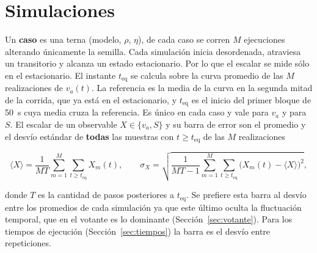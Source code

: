 \documentclass[10pt,a4paper]{article}
\newcommand{\va}{\ensuremath{v_a}}
\newcommand{\teq}{\ensuremath{t_{\mathrm{eq}}}}
\begin{document}
\section{Simulaciones}

Un \textbf{caso} es una terna (modelo, $\rho$, $\eta$), de cada caso se corren $M$ ejecuciones alterando únicamente la semilla.
Cada simulación inicia desordenada, atraviesa un transitorio y alcanza un estado estacionario. Por lo que el escalar se mide sólo en el estacionario. El instante \teq{} se calcula sobre la curva promedio de las $M$ realizaciones de $\va(t)$.
La referencia es la media de la curva en la segunda mitad de la corrida, que ya está en el estacionario, y \teq{} es el inicio del primer bloque de \SI{50}{s} cuya media cruza la referencia. Es único en cada caso y vale para \va{} y para $S$. El escalar de un observable $X \in \{\va, S\}$ y su barra de error son el promedio y el desvío estándar de \textbf{todas} las muestras con $t \ge \teq$ de las $M$ realizaciones

\begin{equation}
    \langle X \rangle = \frac{1}{M T} \sum_{m=1}^{M} \sum_{t \ge \teq} X_m(t),
    \qquad
    \sigma_X = \sqrt{\frac{1}{M T - 1} \sum_{m=1}^{M} \sum_{t \ge \teq}
               \big(X_m(t) - \langle X \rangle\big)^2},
    \label{eq:promedio}
\end{equation}

donde $T$ es la cantidad de pasos posteriores a \teq. Se prefiere esta barra al desvío entre los promedios de cada simulación ya que este último oculta la fluctuación temporal, que en el votante es lo dominante (Sección~\ref{sec:votante}).
Para los tiempos de ejecución (Sección~\ref{sec:tiempos}) la barra es el desvío entre repeticiones.
\end{document}
